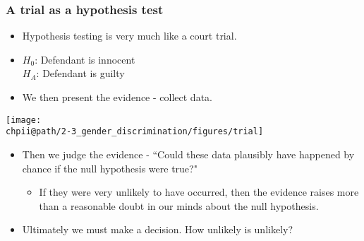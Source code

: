 \documentclass[slidestop,compress,mathserif]{beamer}
\makeatletter
\def\chpii@path{../../Chp 2}
\makeatother
\begin{document}

\begin{frame}
\frametitle{A trial as a hypothesis test}

{
\begin{itemize}

\item Hypothesis testing is very much like a court trial.

\item $H_0$: Defendant is innocent \\
$H_A$: Defendant is guilty

\item We then present the evidence - collect data.

\end{itemize}
}
{
\texttt{[image: \\chpii@path/2-3\_gender\_discrimination/figures/trial]}
}

\begin{itemize}

\item Then we judge the evidence - ``Could these data plausibly have happened by chance if the null hypothesis were true?"
\begin{itemize}
\item If they were very unlikely to have occurred, then the evidence raises more than a reasonable doubt in our minds about the null hypothesis.
\end{itemize}

\item Ultimately we must make a decision. How unlikely is unlikely?

\end{itemize}


\end{frame}

\end{document}
